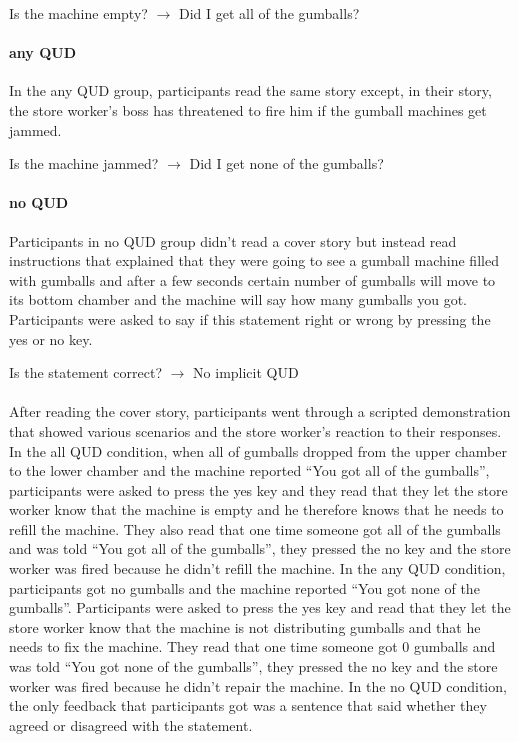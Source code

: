 \documentclass[12pt]{article}
\begin{document}
\begin{center}Is the machine empty? $\rightarrow$ Did I get all of the gumballs?\end{center}

\paragraph{any QUD} In the any QUD group, participants read the same story except, in their story, the store worker’s boss has threatened to fire him if the gumball machines get jammed. 

\begin{center}Is the machine jammed? $\rightarrow$ Did I get none of the gumballs?\end{center}

\paragraph{no QUD} Participants in no QUD group didn’t read a cover story but instead read instructions that explained that they were going to see a gumball machine filled with gumballs and after a few seconds certain number of gumballs will move to its bottom chamber and the machine will say how many gumballs you got. Participants were asked to say if this statement right or wrong by pressing the yes or no key.

\begin{center}Is the statement correct? $\rightarrow$ No implicit QUD\end{center}

\paragraph{}After reading the cover story, participants went through a scripted demonstration that showed various scenarios and the store worker’s reaction to their responses. In the all QUD condition, when all of gumballs dropped from the upper chamber to the lower chamber and the machine reported “You got all of the gumballs”, participants were asked to press the yes key and they read that they let the store worker know that the machine is empty and he therefore knows that he needs to refill the machine. They also read that one time someone got all of the gumballs and was told “You got all of the gumballs”, they pressed the no key and the store worker was fired because he didn’t refill the machine. In the any QUD condition, participants got no gumballs and the machine reported “You got none of the gumballs”. Participants were asked to press the yes key and read that they let the store worker know that the machine is not distributing gumballs and that he needs to fix the machine. They read that one time someone got 0 gumballs and was told “You got none of the gumballs”, they pressed the no key and the store worker was fired because he didn’t repair the machine. In the no QUD condition, the only feedback that participants got was a sentence that said whether they agreed or disagreed with the statement.
\end{document}
